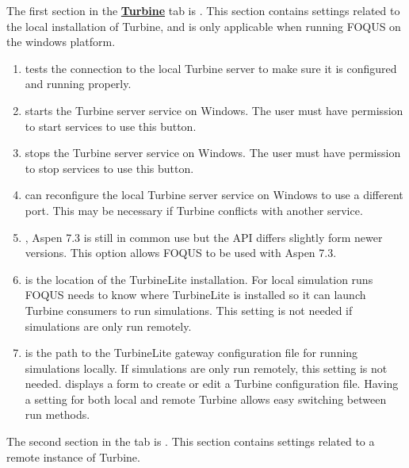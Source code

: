 The first section in the \textbf{\underline{Turbine}} tab is . This section contains settings related to the local installation of Turbine, and is only applicable when running FOQUS on the windows platform.
\begin{enumerate}
	\item {} tests the connection to the local Turbine server to make sure it is configured and running properly.
	
	\item {} starts the Turbine server service on Windows. The user must have permission to start services to use this button.
	
	\item {} stops the Turbine server service on Windows. The user must have permission to stop services to use this button.
	
	\item {} can reconfigure the local Turbine server service on Windows to use a different port. This may be necessary if Turbine conflicts with another service.
	
	\item {}, Aspen 7.3 is still in common use but the API differs slightly form newer versions. This option allows FOQUS to be used with Aspen 7.3.
	
	\item {} is the location of the TurbineLite installation. For local simulation runs FOQUS needs to know where TurbineLite is installed so it can launch Turbine consumers to run simulations. This setting is not needed if simulations are only run remotely.
		
	\item {} is the path to the TurbineLite gateway configuration file for running simulations locally. If simulations are only run remotely, this setting is not needed.  displays a form to create or edit a Turbine configuration file. Having a setting for both local and remote Turbine allows easy switching between run methods.
	
\end{enumerate}

The second section in the  tab is . This section contains settings related to a remote instance of Turbine.

